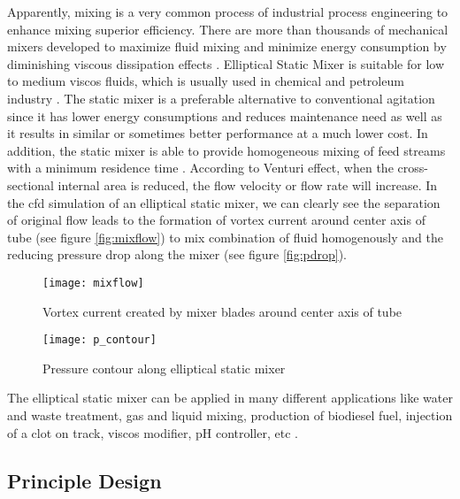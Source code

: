 Apparently, mixing is a very common process of industrial process engineering to enhance mixing superior efficiency. There are more than thousands of mechanical mixers developed to maximize fluid mixing and minimize energy consumption by diminishing viscous dissipation effects \cite{mixing:article}. Elliptical Static Mixer is suitable for low to medium \gls{viscos} fluids, which is usually used in chemical and petroleum industry \cite{static:web}. 
The static mixer is a preferable alternative to conventional agitation since it has lower energy consumptions and reduces maintenance need as well as it results in similar or sometimes better performance at a much lower cost. In addition, the static mixer is able to provide homogeneous mixing of feed streams with a minimum residence time \cite{thakur:article}. According to Venturi effect, when the cross-sectional internal area is reduced, the flow velocity or flow rate will increase. 
In the \gls{cfd} simulation of an elliptical static mixer, we can clearly see the separation of original flow leads to the formation of vortex current around center axis of tube (see figure \vref{fig:mixflow}) to mix combination of fluid homogenously and the reducing pressure drop along the mixer (see figure \vref{fig:pdrop}).

\begin{figure}[h]
  \centering
  \texttt{[image: mixflow]}
  \caption{ Vortex current created by mixer blades around center axis of tube\cite{cfd:article}}
  \label{fig:mixflow}
\end{figure}
\begin{figure}[h]
  \centering
  \texttt{[image: p\_contour]}
  \caption{ Pressure contour along elliptical static mixer\cite{cfd:article}}
  \label{fig:pdrop}
\end{figure}

The elliptical static mixer can be applied in many different applications like water and waste treatment, gas and liquid mixing, production of biodiesel fuel, injection of a clot on track, \gls{viscos} modifier, pH controller, etc \cite{static:web}. 

\subsection{Principle Design}

